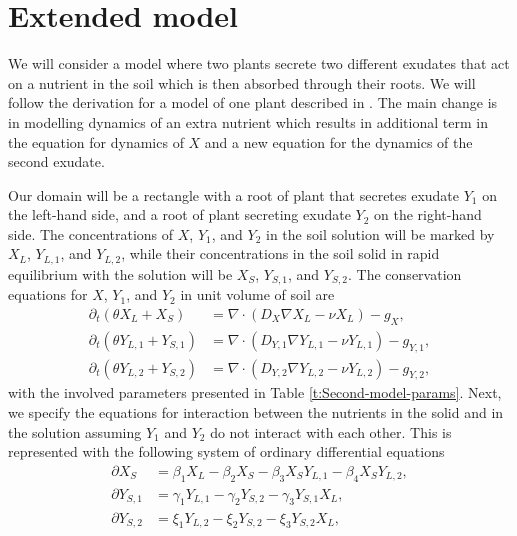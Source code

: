 \documentclass[11pt]{article}
\numberwithin{equation}{section}
\begin{document}
\newpage


\section{Extended model}
\label{sec:Extension}
We will consider a model where two plants secrete two different exudates that act on a nutrient in the soil which is then absorbed through their roots. We will follow the derivation for a model of one plant described in \cite{Ptashnyk-2011}. The main change is in modelling dynamics of an extra nutrient which results in additional term in the equation for dynamics of $X$ and a new equation for the dynamics of the second exudate.
	
Our domain will be a rectangle with a root of plant that secretes exudate $Y_1$ on the left-hand side, and a root of plant secreting exudate $Y_2$ on the right-hand side. The concentrations of $X$, $Y_1$, and $Y_2$ in the soil solution will be marked by $X_L$, $Y_{L,1}$, and $Y_{L,2}$, while their concentrations in the soil solid in rapid equilibrium with the solution will be $X_S$, $Y_{S,1}$, and $Y_{S,2}$. The conservation equations for $X$, $Y_1$, and $Y_2$ in unit volume of soil are
\begin{align}
	\partial_t(\theta X_L + X_S) &= \nabla \cdot(D_X \nabla X_L - \nu X_L) - g_X, \label{x_1}\\
	\partial_t(\theta Y_{L,1} + Y_{S,1}) &= \nabla \cdot(D_{Y,1} \nabla Y_{L,1} - \nu Y_{L,1}) - g_{Y,1}, \label{y1_1} \\
	\partial_t(\theta Y_{L,2} + Y_{S,2}) &= \nabla \cdot(D_{Y,2} \nabla Y_{L,2} - \nu Y_{L,2}) - g_{Y,2}, \label{y2_1}		
\end{align}
with the involved parameters presented in Table \ref{t:Second-model-params}. Next, we specify the equations for interaction between the nutrients in the solid and in the solution assuming $Y_1$ and $Y_2$ do not interact with each other. This is represented with the following system of ordinary differential equations
\begin{align}
	\partial X_S &= \beta_1 X_L - \beta_2 X_S - \beta_3 X_S Y_{L,1} - \beta_4 X_S Y_{L,2},  \\
	\partial Y_{S,1} &= \gamma_1 Y_{L,1} - \gamma_2 Y_{S,2} - \gamma_3 Y_{S,1} X_L, \\
	\partial Y_{S,2} &= \xi_1 Y_{L,2} - \xi_2 Y_{S,2} - \xi_3 Y_{S,2} X_L,
\end{align}	
\end{document}

